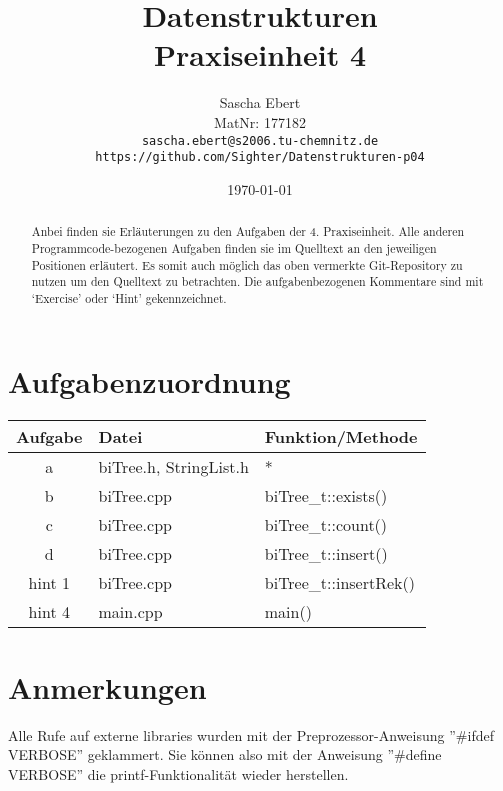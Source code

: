 \documentclass{article}
\title{Datenstrukturen\\Praxiseinheit 4}
\author
{
	Sascha Ebert\\
	MatNr: 177182\\
	\texttt{sascha.ebert@s2006.tu-chemnitz.de}\\
	\texttt{https://github.com/Sighter/Datenstrukturen-p04}\\
}
\date{\today}
\begin{document}
\maketitle

\begin{abstract}
Anbei finden sie Erläuterungen zu den Aufgaben der 4. Praxiseinheit.
Alle anderen Programmcode-bezogenen Aufgaben finden sie im Quelltext an den jeweiligen Positionen
erläutert. Es somit auch möglich das oben vermerkte Git-Repository zu nutzen um den Quelltext
zu betrachten. Die aufgabenbezogenen Kommentare sind mit `Exercise' oder `Hint' gekennzeichnet.
\end{abstract}

\section*{Aufgabenzuordnung}
\begin{tabular}{ c l l }
  Aufgabe & Datei & Funktion/Methode\\
  \hline
  a & biTree.h, StringList.h & *\\
  b & biTree.cpp & biTree\_t::exists()\\
  c & biTree.cpp & biTree\_t::count()\\
  d & biTree.cpp & biTree\_t::insert()\\
  \hline
  hint 1 & biTree.cpp & biTree\_t::insertRek()\\
  hint 4 & main.cpp & main()\\
\end{tabular}

\section*{Anmerkungen}
Alle Rufe auf externe libraries wurden mit der Preprozessor-Anweisung ''\#ifdef VERBOSE'' geklammert.
Sie können also mit der Anweisung ''\#define VERBOSE'' die printf-Funktionalität wieder herstellen.
\end{document}
